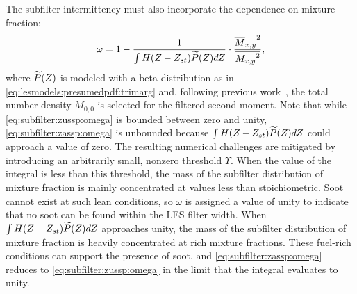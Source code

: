 
The subfilter intermittency must also incorporate the dependence on mixture fraction:
\begin{equation}\label{eq:subfilter:zassp:omega}
  \omega = 1 - \frac{1}{\int H(Z - Z_{st})\widetilde{P}(Z) dZ} \cdot \frac{{\overline{M}_{x,y}}^2}{\overline{{M_{x,y}}^2}},
\end{equation}
where $\widetilde{P}(Z)$ is modeled with a beta distribution as in \cref{eq:lesmodels:presumedpdf:trimarg} and, following previous work~\cite{subfilterpdf2011}, the total number density $M_{0,0}$ is selected for the filtered second moment. Note that while \cref{eq:subfilter:zussp:omega} is bounded between zero and unity, \cref{eq:subfilter:zassp:omega} is unbounded because $\int H(Z - Z_{st})\widetilde{P}(Z) dZ$ could approach a value of zero. The resulting numerical challenges are mitigated by introducing an arbitrarily small, nonzero threshold $\Upsilon$. When the value of the integral is less than this threshold, the mass of the subfilter distribution of mixture fraction is mainly concentrated at values less than stoichiometric. Soot cannot exist at such lean conditions, so $\omega$ is assigned a value of unity to indicate that no soot can be found within the LES filter width. When $\int H(Z - Z_{st})\widetilde{P}(Z) dZ$ approaches unity, the mass of the subfilter distribution of mixture fraction is heavily concentrated at rich mixture fractions. These fuel-rich conditions can support the presence of soot, and \cref{eq:subfilter:zassp:omega} reduces to \cref{eq:subfilter:zussp:omega} in the limit that the integral evaluates to unity.


